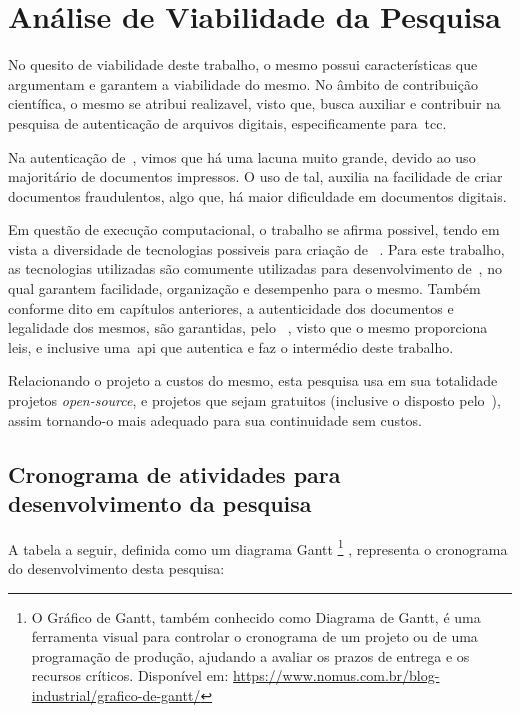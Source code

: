 \newcommand{\footnotegantt}{
    \footnote{O Gráfico de Gantt, também conhecido como Diagrama de Gantt,
        é uma ferramenta visual para controlar o cronograma de um projeto ou
        de uma programação de produção, ajudando a avaliar os prazos de
        entrega e os recursos críticos.
        Disponível em:
        \url{https://www.nomus.com.br/blog-industrial/grafico-de-gantt/}
    }
}
\chapter{Análise de Viabilidade da Pesquisa}
\label{ch:analise-de-viabilidade-da-pesquisa}

No quesito de viabilidade deste trabalho, o mesmo possui características que
argumentam e garantem a viabilidade do mesmo.
No âmbito de contribuição científica, o mesmo se atribui realizavel, visto que,
busca auxiliar e contribuir na pesquisa de autenticação de arquivos digitais,
especificamente para~\acrlong{tcc}.

Na autenticação de~, vimos que há uma lacuna muito grande,
devido ao uso majoritário de documentos impressos.
O uso de tal, auxilia na facilidade de criar documentos fraudulentos, algo que,
há maior dificuldade em documentos digitais.

Em questão de execução computacional, o trabalho se afirma possivel,
tendo em vista a diversidade de tecnologias possiveis para criação de
~.
Para este trabalho, as tecnologias utilizadas são comumente utilizadas para
desenvolvimento de~, no qual garantem facilidade, organização
e desempenho para o mesmo.
Também conforme dito em capítulos anteriores, a autenticidade dos documentos
e legalidade dos mesmos, são garantidas, pelo ~\citeauthor*{decreto112020},
visto que o mesmo proporciona leis, e inclusive uma~\acrshort{api} que
autentica e faz o intermédio deste trabalho.

Relacionando o projeto a custos do mesmo, esta pesquisa usa em sua totalidade
projetos \textit{open-source}, e projetos que sejam gratuitos (inclusive o
disposto pelo~\citeauthor*{decreto112020}), assim tornando-o mais adequado
para sua continuidade sem custos.
\newpage
\section{Cronograma de atividades para desenvolvimento da pesquisa}
\label{sec:cronograma-de-desenvolvimento-de-pesquisa}

A tabela a seguir, definida como um diagrama Gantt\footnotegantt, representa o
cronograma do desenvolvimento desta pesquisa:


